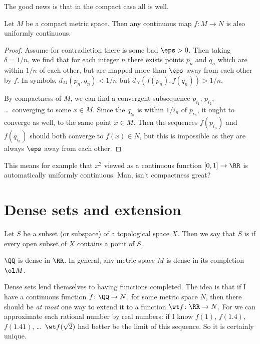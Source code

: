 The good news is that in the compact case all is well.
\begin{theorem}
	Let $M$ be a compact metric space.
	Then any continuous map $f \colon M \to N$ is
	also uniformly continuous.
\end{theorem}
\begin{proof}
	Assume for contradiction there is some bad $\eps > 0$.
	Then taking $\delta = 1/n$,
	we find that for each integer $n$
	there exists points $p_n$ and $q_n$
	which are within $1/n$ of each other,
	but are mapped more than $\eps$ away from each other by $f$.
	In symbols, $d_M(p_n, q_n) < 1/n$ but $d_N(f(p_n), f(q_n)) > 1/n$.

	By compactness of $M$,
	we can find a convergent subsequence
	$p_{i_1}$, $p_{i_2}$, \dots\ converging to some $x \in M$.
	Since the $q_{i_n}$ is within $1/i_n$ of $p_{i_n}$,
	it ought to converge as well, to the same point $x \in M$.
	Then the sequences $f(p_{i_n})$ and $f(q_{i_n})$
	should both converge to $f(x) \in N$,
	but this is impossible as they are always $\eps$
	away from  each other.
\end{proof}
This means for example that $x^2$ viewed
as a continuous function $[0,1] \to \RR$ is automatically
uniformly continuous.
Man, isn't compactness great?

\section{Dense sets and extension}

\begin{definition}
	Let $S$ be a subset (or subspace) of a topological space $X$.
	Then we say that $S$ is 
	if every open subset of $X$ contains a point of $S$.
\end{definition}

\begin{example}
	\listhack
	\begin{enumerate}[(a)]
		\ii $\QQ$ is dense in $\RR$.
		\ii In general, any metric space $M$ is dense
		in its completion $\ol M$.
	\end{enumerate}
\end{example}

Dense sets lend themselves to having functions completed.
The idea is that if I have a continuous function
$f \colon \QQ \to N$, for some metric space $N$,
then there should be \emph{at most} one way to extend it to a function
$\wt f \colon \RR \to N$.
For we can approximate each rational number by real numbers:
if I know $f(1)$, $f(1.4)$, $f(1.41)$, \dots\
$\wt f(\sqrt2)$ had better be the limit of this sequence.
So it is certainly unique.

